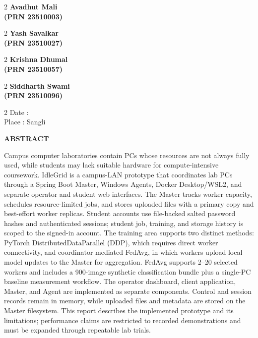 \documentclass{article}
\begin{document}
		\begin{multicols}{2}
\textbf{Avadhut Mali\\ (PRN 23510003)}
\end{multicols}
\begin{multicols}{2}
\textbf{Yash Savalkar\\ (PRN 23510027)}
\end{multicols}
\begin{multicols}{2}
\textbf{Krishna Dhumal\\ (PRN 23510057)}
\end{multicols}
\begin{multicols}{2}
\textbf{Siddharth Swami\\ (PRN 23510096)}
\end{multicols}

		\begin{multicols}{2}
		\noindent
		  Date : \\
		  Place : Sangli
		\end{multicols}
	
	\pagebreak
	\begin{center}
	\Large\textbf{ABSTRACT}
	\end{center}
	\noindent
Campus computer laboratories contain PCs whose resources are not always fully used, while students may lack suitable hardware for compute-intensive coursework. IdleGrid is a campus-LAN prototype that coordinates lab PCs through a Spring Boot Master, Windows Agents, Docker Desktop/WSL2, and separate operator and student web interfaces. The Master tracks worker capacity, schedules resource-limited jobs, and stores uploaded files with a primary copy and best-effort worker replicas. Student accounts use file-backed salted password hashes and authenticated sessions; student job, training, and storage history is scoped to the signed-in account. The training area supports two distinct methods: PyTorch DistributedDataParallel (DDP), which requires direct worker connectivity, and coordinator-mediated FedAvg, in which workers upload local model updates to the Master for aggregation. FedAvg supports 2--20 selected workers and includes a 900-image synthetic classification bundle plus a single-PC baseline measurement workflow. The operator dashboard, client application, Master, and Agent are implemented as separate components. Control and session records remain in memory, while uploaded files and metadata are stored on the Master filesystem. This report describes the implemented prototype and its limitations; performance claims are restricted to recorded demonstrations and must be expanded through repeatable lab trials.
	
\end{document}
